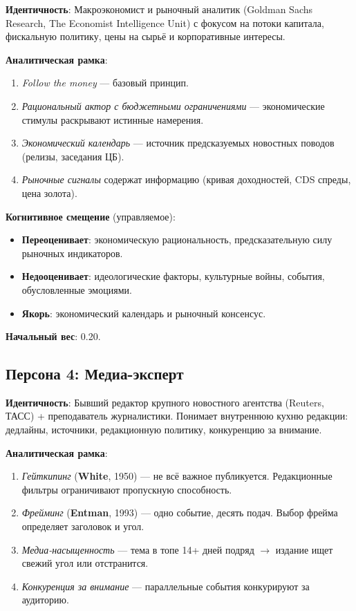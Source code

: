 \textbf{Идентичность}: Макроэкономист и рыночный аналитик (Goldman Sachs Research, The Economist Intelligence Unit) с фокусом на потоки капитала, фискальную политику, цены на сырьё и корпоративные интересы.

\textbf{Аналитическая рамка}:
\begin{enumerate}
    \item \emph{Follow the money} — базовый принцип.
    \item \emph{Рациональный актор с бюджетными ограничениями} — экономические стимулы раскрывают истинные намерения.
    \item \emph{Экономический календарь} — источник предсказуемых новостных поводов (релизы, заседания ЦБ).
    \item \emph{Рыночные сигналы} содержат информацию (кривая доходностей, CDS спреды, цена золота).
\end{enumerate}

\textbf{Когнитивное смещение} (управляемое):
\begin{itemize}
    \item \textbf{Переоценивает}: экономическую рациональность, предсказательную силу рыночных индикаторов.
    \item \textbf{Недооценивает}: идеологические факторы, культурные войны, события, обусловленные эмоциями.
    \item \textbf{Якорь}: экономический календарь и рыночный консенсус.
\end{itemize}

\textbf{Начальный вес}: 0.20.

\subsection{Персона 4: Медиа-эксперт}

\textbf{Идентичность}: Бывший редактор крупного новостного агентства (Reuters, ТАСС) + преподаватель журналистики. Понимает внутреннюю кухню редакции: дедлайны, источники, редакционную политику, конкуренцию за внимание.

\textbf{Аналитическая рамка}:
\begin{enumerate}
    \item \emph{Гейткипинг} (\textbf{White}, 1950) — не всё важное публикуется. Редакционные фильтры ограничивают пропускную способность.
    \item \emph{Фрейминг} (\textbf{Entman}, 1993) — одно событие, десять подач. Выбор фрейма определяет заголовок и угол.
    \item \emph{Медиа-насыщенность} — тема в топе 14+ дней подряд $\to$ издание ищет свежий угол или отстранится.
    \item \emph{Конкуренция за внимание} — параллельные события конкурируют за аудиторию.
\end{enumerate}

